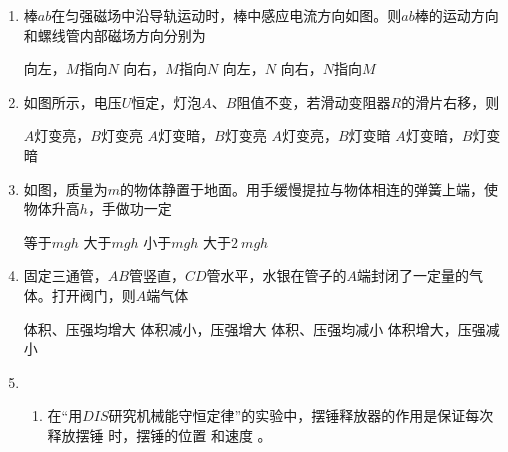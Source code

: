 \begin{enumerate}
\item
棒$ ab $在匀强磁场中沿导轨运动时，棒中感应电流方向如图。则$ ab $棒的运动方向和螺线管内部磁场方向分别为  
\begin{figure}[h!]
\centering

\end{figure}

\fourchoices
{向左，$ M $指向$ N $}
{向右，$ M $指向$ N $}
{向左，$ N $}
{向右，$ N $指向$ M $}



\item 
如图所示，电压$ U $恒定，灯泡$ A $、$ B $阻值不变，若滑动变阻器$ R $的滑片右移，则  
\begin{figure}[h!]
\centering

\end{figure}

\fourchoices
{$ A $灯变亮，$ B $灯变亮}
{$ A $灯变暗，$ B $灯变亮}
{$ A $灯变亮，$ B $灯变暗}
{$ A $灯变暗，$ B $灯变暗}



\item
如图，质量为$ m $的物体静置于地面。用手缓慢提拉与物体相连的弹簧上端，使物体升高$ h $，手做功一定  
\begin{figure}[h!]
\centering

\end{figure}

\fourchoices
{等于$ mgh $}
{大于$ mgh $}
{小于$ mgh $}
{大于$ 2 \ m gh $}




\item
固定三通管，$ AB $管竖直，$ CD $管水平，水银在管子的$ A $端封闭了一定量的气体。打开阀门，则$ A $端气体  
\begin{figure}[h!]
\centering

\end{figure}

\fourchoices
{体积、压强均增大}
{体积减小，压强增大}
{体积、压强均减小}
{体积增大，压强减小}




\gaokaosy




\item
\begin{enumerate}
\item
在“用$ DIS $研究机械能守恒定律”的实验中，摆锤释放器的作用是保证每次释放摆锤
时，摆锤的位置 \underlinegap 和速度 \underlinegap 。



\end{enumerate}
\end{enumerate}
